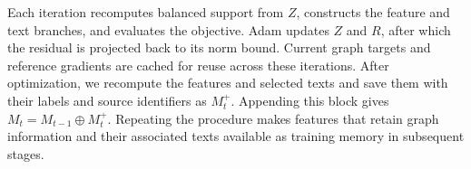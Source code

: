 Each iteration recomputes balanced support from $Z$, constructs the
feature and text branches, and evaluates the objective. Adam updates
$Z$ and $R$, after which the residual is projected back to its norm
bound. Current graph targets and reference gradients are cached for
reuse across these iterations. After optimization, we recompute the
features and selected texts and save them with their labels and source
identifiers as $M_t^+$. Appending this block gives
$M_t=M_{t-1}\oplus M_t^+$. Repeating the procedure makes features that
retain graph information and their associated texts available as training memory in
subsequent stages.
